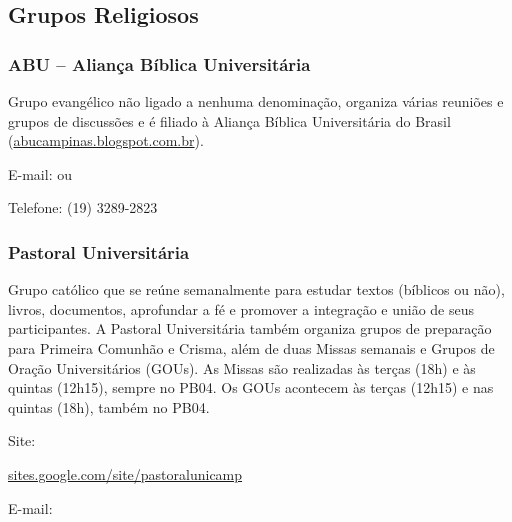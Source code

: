 \subsection{Grupos Religiosos}

\subsubsection{ABU -- Aliança Bíblica Universitária}

Grupo evangélico não ligado a nenhuma denominação, organiza várias reuniões e
grupos de discussões e é filiado à Aliança Bíblica Universitária do Brasil
(\url{abucampinas.blogspot.com.br}).

\begin{compactitemize}
\item E-mail:  ou
\item Telefone: (19) 3289-2823
\end{compactitemize}

\subsubsection{Pastoral Universitária}

Grupo católico que se reúne semanalmente para estudar textos (bíblicos ou não),
livros, documentos, aprofundar a fé e promover a integração e união de seus
participantes. A Pastoral Universitária também organiza grupos de preparação
para Primeira Comunhão e Crisma, além de duas Missas semanais e Grupos de
Oração Universitários (GOUs). As Missas são realizadas às terças (18h) e às
quintas (12h15), sempre no PB04. Os GOUs acontecem às terças (12h15) e nas
quintas (18h), também no PB04.

\begin{compactitemize}
\item Site:
\begin{small}
  \url{sites.google.com/site/pastoralunicamp}
\end{small}
\item E-mail: 
\end{compactitemize}
